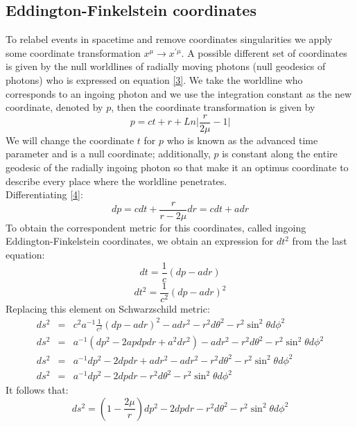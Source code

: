 \documentclass[letterpaper,11pt,onecolumn]{article}
\begin{document}
\subsection{Eddington-Finkelstein coordinates}

To relabel events in spacetime and remove coordinates singularities we apply some coordinate transformation $x^{\mu}\rightarrow x^{'\mu}$. A possible different set of coordinates is given by the null worldlines of radially moving photons (null geodesics of photons) who is expressed on equation \ref{3}. We take the worldline who corresponds to an ingoing photon and we use the integration constant as the new coordinate, denoted by $p$, then the coordinate transformation is given by 
\begin{equation}
    p= ct + r + Ln\Big| \frac{r}{2\mu}-1 \Big|\label{4}
\end{equation}
We will change the coordinate $t$ for $p$ who is known as the advanced time parameter and is a null coordinate; additionally, $p$ is constant along the entire geodesic of the radially ingoing photon so that make it an optimus coordinate to describe every place where the worldline penetrates.\\
Differentiating \ref{4}: 
\begin{equation*}
    dp= cdt +\frac{r}{r-2\mu}dr=cdt+adr 
\end{equation*}
To obtain the correspondent metric for this coordinates, called ingoing Eddington-Finkelstein coordinates, we obtain an expression for $dt^2$ from the last equation:
\begin{equation*}
    dt= \frac{1}{c} (dp-adr)
\end{equation*}
\begin{equation*}
    dt^2= \frac{1}{c^2} (dp-adr)^2
\end{equation*}
Replacing this element on Schwarzschild metric:
\begin{eqnarray*}
    	ds^2 &=&c^2a^{-1}\frac{1}{c^2} (dp-adr)^2 - a dr^2 - r^2 d\theta^2 - r^2 \sin^2 \theta d\phi^2\\
    	ds^2 &=& a^{-1}(dp^2-2apdpdr+a^2dr^2) - a dr^2 - r^2 d\theta^2 - r^2 \sin^2 \theta d\phi^2\\
    	ds^2 &=& a^{-1}dp^2-2dpdr+adr^2- a dr^2 - r^2 d\theta^2 - r^2 \sin^2 \theta d\phi^2\\ 
    	ds^2 &=& a^{-1}dp^2-2dpdr-  r^2 d\theta^2 - r^2 \sin^2 \theta d\phi^2
\end{eqnarray*}
It follows that:
\begin{equation}
ds^2 =\left( 1 - \frac{2\mu}{r}\right)dp^2-2dpdr- r^2 d\theta^2 - r^2 \sin^2 \theta d\phi^2 \label{5}
\end{equation}
\end{document}
